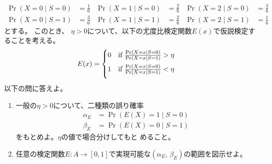 \documentclass[lualatex,ja=standard,a4paper]{bxjsarticle}
\theoremstyle{definition}
\theoremstyle{remark}
\begin{document}
\begin{align*}
\Pr(X = 0 \mid S = 0) &= \frac16&
\Pr(X = 1 \mid S = 0) &= \frac26&
\Pr(X = 2 \mid S = 0) &= \frac36\\
\Pr(X = 0 \mid S = 1) &= \frac36&
\Pr(X = 1 \mid S = 1) &= \frac26&
\Pr(X = 2 \mid S = 1) &= \frac16
\end{align*}
とする。
このとき、 $\eta> 0$について、以下の尤度比検定関数$E(x)$で仮説検定することを考える。
\begin{align*}
E(x)&=
\begin{cases}
\vspace{.5em}
0&\text{if } \frac{\Pr(X = x\mid S = 0)}{\Pr(X = x\mid S = 1)} > \eta\\\vspace{.5em}
1&\text{if } \frac{\Pr(X = x\mid S = 0)}{\Pr(X = x\mid S = 1)} < \eta
\end{cases}
\end{align*}
以下の問に答えよ。
\begin{enumerate}
\setlength{\itemsep}{1em}
\item 一般の$\eta>0$について、二種類の誤り確率
\begin{align*}
\alpha_E&=\Pr(E(X)=1\mid S=0)\\
\beta_E&=\Pr(E(X)=0\mid S=1)
\end{align*}
をもとめよ。$\eta$の値で場合分けしてもと
めること。
\item 任意の検定関数$E\colon A\to[0,1]$で実現可能な$(\alpha_E,\, \beta_E)$の範囲を図示せよ。
\end{enumerate}
\end{document}
